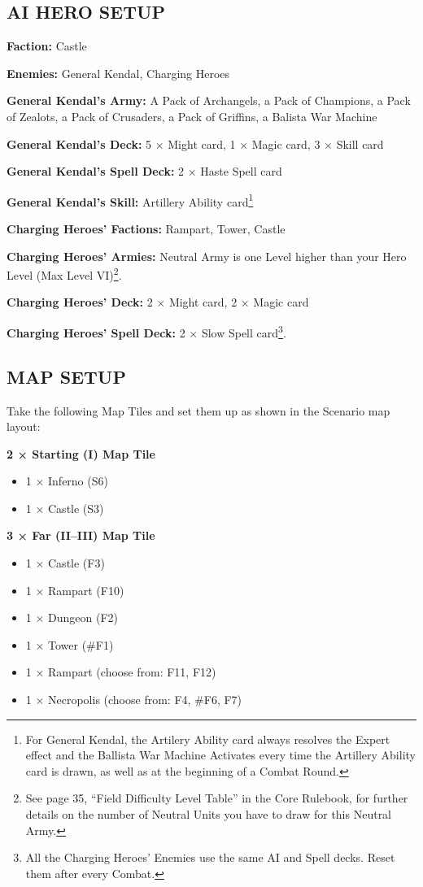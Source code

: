 \begin{multicols*}{2}
\subsection*{\MakeUppercase{AI Hero Setup}}

\textbf{Faction:} Castle

\textbf{Enemies:} General Kendal, Charging Heroes

\textbf{General Kendal's Army:} A Pack of Archangels, a Pack of Champions, a Pack of Zealots, a Pack of Crusaders, a Pack of Griffins, a Balista War Machine

\textbf{General Kendal's Deck:} 5 × Might card, 1 × Magic card, 3 × Skill card

\textbf{General Kendal's Spell Deck:} 2 × Haste Spell card

\textbf{General Kendal's Skill:} Artillery Ability card\footnote{For General Kendal, the Artilery Ability card always resolves the Expert effect and the Ballista War Machine Activates every time the Artillery Ability card is drawn, as well as at the beginning of a Combat Round.}

\textbf{Charging Heroes' Factions:} Rampart, Tower, Castle

\textbf{Charging Heroes' Armies:} Neutral Army is one Level higher than your Hero Level (Max Level VI)\footnote{See page 35, ``Field Difficulty Level Table'' in the Core Rulebook, for further details on the number of Neutral Units you have to draw for this Neutral Army.}.

\textbf{Charging Heroes' Deck:} 2 × Might card, 2 × Magic card

\textbf{Charging Heroes' Spell Deck:} 2 × Slow Spell card\footnote{All the Charging Heroes' Enemies use the same AI and Spell decks. Reset them after every Combat.}.

\subsection*{\MakeUppercase{Map Setup}}

Take the following Map Tiles and set them up as shown in the Scenario map layout:

\textbf{2 × Starting (I) Map Tile}
\begin{itemize}
  \item 1 × Inferno (S6)
  \item 1 × Castle (S3)
\end{itemize}

\textbf{3 × Far (II--III) Map Tile}
\begin{itemize}
  \item 1 × Castle (F3)
  \item 1 × Rampart (F10)
  \item 1 × Dungeon (F2)
  \item 1 × Tower (\#F1)
  \item 1 × Rampart (choose from: F11, F12)
  \item 1 × Necropolis (choose from: F4, \#F6, F7)
\end{itemize}


\end{multicols*}
